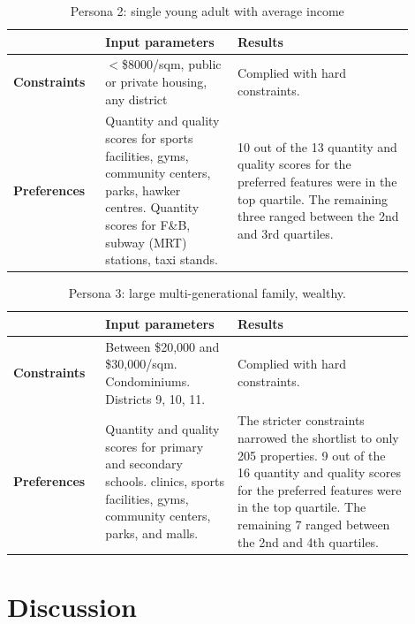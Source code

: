 \documentclass[a4paper, 11pt]{article}
\begin{document}
\begin{table}[ht]
    \centering
    \begin{tabular}{p{0.2\linewidth} | p{0.3\linewidth} | p{0.4\linewidth}} \hline
      & \textbf{Input parameters}  & \textbf{Results} \\ \hline
      \textbf{Constraints}& $<$\$8000/sqm, public or private housing, any district & Complied with hard constraints. \\ \hline
\textbf{Preferences} & 
Quantity and quality scores for sports facilities, gyms, community centers, parks, hawker centres. Quantity scores for F\&B, subway (MRT) stations, taxi stands. & 
10 out of the 13 quantity and quality scores for the preferred features were in the top quartile. The remaining three ranged between the 2nd and 3rd quartiles.

 \\\hline
    \end{tabular}
    \caption{Persona 2: single young adult with average income}
    \label{tab:my_label}
\end{table}


\begin{table}[ht]
    \centering
    \begin{tabular}{p{0.2\linewidth} | p{0.3\linewidth} | p{0.4\linewidth}} \hline
      & \textbf{Input parameters}  & \textbf{Results} \\ \hline
      \textbf{Constraints}& Between \$20,000 and \$30,000/sqm. Condominiums. Districts 9, 10, 11.
 & Complied with hard constraints. \\ \hline
\textbf{Preferences} & 
Quantity and quality scores for primary and secondary schools. clinics, sports facilities, gyms, community centers, parks, and malls. & The stricter constraints narrowed the shortlist to only 205 properties.
9 out of the 16 quantity and quality scores for the preferred features were in the top quartile. The remaining 7 ranged between the 2nd and 4th quartiles. 

 \\\hline
    \end{tabular}
    \caption{Persona 3: large multi-generational family, wealthy.
}
    \label{tab:my_label}
\end{table}


\section{Discussion}
\end{document}
